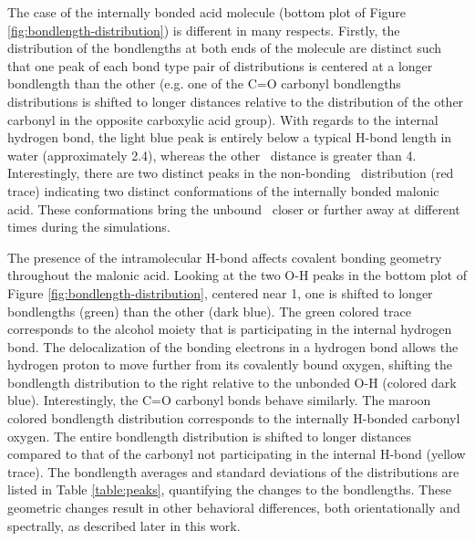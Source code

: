 The case of the internally bonded acid molecule (bottom plot of Figure \ref{fig:bondlength-distribution}) is different in many respects. Firstly, the distribution of the bondlengths at both ends of the molecule are distinct such that one peak of each bond type pair of distributions is centered at a longer bondlength than the other (e.g. one of the C=O carbonyl bondlengths distributions is shifted to longer distances relative to the distribution of the other carbonyl in the opposite carboxylic acid group). With regards to the internal hydrogen bond, the light blue peak is entirely below a typical H-bond length in water (approximately 2.4\angs), whereas the other \ocarbh~distance is greater than 4\angs. Interestingly, there are two distinct peaks in the non-bonding \ocarbh~distribution (red trace) indicating two distinct conformations of the internally bonded malonic acid. These conformations bring the unbound \ocarbh~closer or further away at different times during the simulations.

The presence of the intramolecular H-bond affects covalent bonding geometry throughout the malonic acid. Looking at the two O-H peaks in the bottom plot of Figure \ref{fig:bondlength-distribution}, centered near 1\angs, one is shifted to longer bondlengths (green) than the other (dark blue). The green colored trace corresponds to the alcohol moiety that is participating in the internal hydrogen bond. The delocalization of the bonding electrons in a hydrogen bond allows the hydrogen proton to move further from its covalently bound oxygen, shifting the bondlength distribution to the right relative to the unbonded O-H (colored dark blue). Interestingly, the C=O carbonyl bonds behave similarly. The maroon colored bondlength distribution corresponds to the internally H-bonded carbonyl oxygen. The entire bondlength distribution is shifted to longer distances compared to that of the carbonyl not participating in the internal H-bond (yellow trace). The bondlength averages and standard deviations of the distributions are listed in Table \ref{table:peaks}, quantifying the changes to the bondlengths. These geometric changes result in other behavioral differences, both orientationally and spectrally, as described later in this work.


